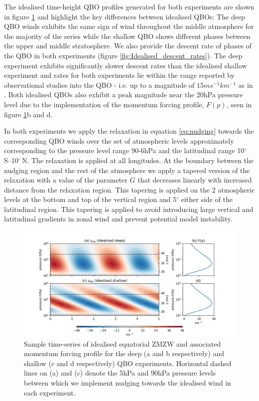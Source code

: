 The idealised time-height QBO profiles generated for both experiments are shown in figure \ref{fig:Idealised_QBO_samples} and highlight the key differences between idealised QBOs: The deep QBO winds exhibits the same sign of wind throughout the middle atmosphere for the majority of the series while the shallow QBO shows different phases between the upper and middle stratosphere. We also provide the descent rate of phases of the QBO in both experiments (figure \ref{fig:Idealised_descent_rates}). The deep experiment exhibits significantly slower descent rates than the idealised shallow experiment and rates for both experiments lie within the range reported by observational studies into the QBO - i.e. up to a magnitude of $15ms^{-1}km^{-1}$ as in \cite{kinnersleyDescent1996}. Both idealised QBOs also exhibit a peak magnitude near the 20hPa pressure level due to the implementation of the momentum forcing profile, $F(p)$, seen in figure \ref{fig:Idealised_QBO_samples}b and d. 

In both experiments we apply the relaxation in equation \ref{eq:nudging} towards the corresponding QBO winds over the set of atmospheric levels approximately corresponding to the pressure level range 90-6hPa and the latitudinal range 10$^{\circ}$\,S--10$^{\circ}$\,N. The relaxation is applied at all longitudes. At the boundary between the nudging region and the rest of the atmosphere we apply a tapered version of the relaxation with a value of the parameter $G$ that decreases linearly with increased distance from the relaxation region. This tapering is applied on the 2 atmospheric levels at the bottom and top of the vertical region and 5$^\circ$ either side of the latitudinal region. This tapering is applied to avoid introducing large vertical and latitudinal gradients in zonal wind and prevent potential model instability. 

\begin{figure}[h!]
\begin{center}
\noindent\includegraphics[width = \linewidth]{Figures/Figures-deepQBO/Idealised_QBO_features.png}
\caption[Idealised QBO winds used for nudging experiments]{Sample time-series of idealised equatorial ZMZW and associated momentum forcing profile for the deep (a and b respectively) and shallow (c and d respectively) QBO experiments. Horizontal dashed lines on (a) and (c) denote the 5hPa and 90hPa pressure levels between which we implement nudging towards the idealised wind in each experiment.}
\label{fig:Idealised_QBO_samples}
\end{center}
\end{figure}

